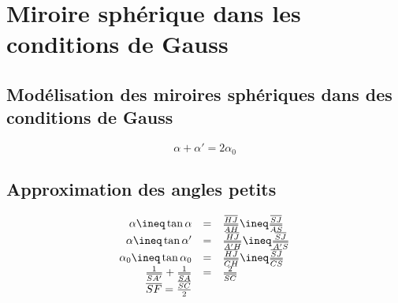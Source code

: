 \section{Miroire sphérique dans les conditions de Gauss}
\subsection{Modélisation des miroires sphériques dans des conditions de Gauss}

\[\alpha + \alpha ' = 2 \alpha_0\]

\subsection{Approximation des angles petits}

\[\begin{array}{rcl}
	\alpha \ineq \tan \alpha &=& \frac{\overline{HJ}}{\overline{AH}} \ineq \frac{\overline{SJ}}{\overline{AS}} \\
	\alpha \ineq \tan \alpha ' &=&\frac{\overline{HJ}}{\overline{A'H}} \ineq \frac{\overline{SJ}}{\overline{A'S}} \\
	\alpha_0 \ineq \tan \alpha_0 &=&\frac{\overline{HJ}}{\overline{CH}} \ineq \frac{\overline{SJ}}{\overline{CS}} \\
	\frac{1}{\overline{SA'}} + \frac{1}{\overline{SA}} &=& \frac{2}{\overline{SC}} \\
	\overline{SF} = \frac{\overline{SC}}{2}
\end{array}\]
